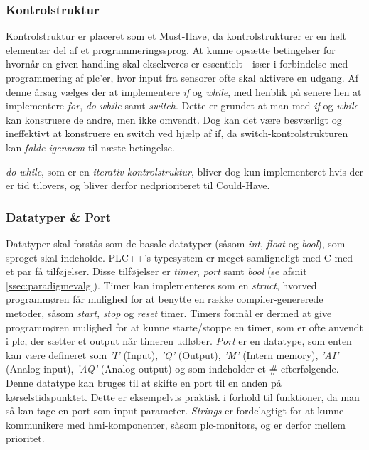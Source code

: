 \subsubsection{Kontrolstruktur}
Kontrolstruktur er placeret som et Must-Have, da kontrolstrukturer er en helt elementær del af et programmeringssprog. At kunne opsætte betingelser for hvornår en given handling skal eksekveres er essentielt - især i forbindelse med programmering af \gls{plc}'er, hvor input fra sensorer ofte skal aktivere en udgang. 
Af denne årsag vælges der at implementere \textit{if} og \textit{while}, med henblik på senere hen at implementere \textit{for}, \textit{do-while} samt \textit{switch}. Dette er grundet at man med \textit{if} og \textit{while} kan konstruere de andre, men ikke omvendt. Dog kan det være besværligt og ineffektivt at konstruere en switch ved hjælp af if, da switch-kontrolstrukturen kan \textit{falde igennem} til næste betingelse.

\textit{do-while}, som er en \textit{iterativ kontrolstruktur}, bliver dog kun implementeret hvis der er tid tilovers, og bliver derfor nedprioriteret til Could-Have. 

\subsubsection{Datatyper \& Port}
\label{subsec:datatyper}
Datatyper skal forstås som de basale datatyper (såsom \textit{int}, \textit{float} og \textit{bool}), som sproget skal indeholde. PLC++'s typesystem er meget samligneligt med C med et par få tilføjelser. Disse tilføjelser er \textit{timer}, \textit{port} samt \textit{bool} (se afsnit \ref{ssec:paradigmevalg}).
Timer kan implementeres som en \textit{struct}, hvorved programmøren får mulighed for at benytte en række compiler-genererede metoder, såsom \textit{start}, \textit{stop} og \textit{reset} timer. Timers formål er dermed at give programmøren mulighed for at kunne starte/stoppe en timer, som er ofte anvendt i \gls{plc}, der sætter et output når timeren udløber.
\textit{Port} er en datatype, som enten kan være defineret som \textit{'I'} (Input), \textit{'Q'} (Output), \textit{'M'} (Intern memory), \textit{'AI'} (Analog input), \textit{'AQ'} (Analog output) og som indeholder et \# efterfølgende. Denne datatype kan bruges til at skifte en port til en anden på kørselstidspunktet. Dette er eksempelvis praktisk i forhold til funktioner, da man så kan tage en port som input parameter.
\textit{Strings} er fordelagtigt for at kunne kommunikere med \gls{hmi}-komponenter, såsom \gls{plc}-monitors, og er derfor mellem prioritet.

